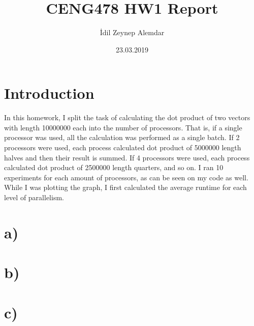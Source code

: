 \documentclass[12pt]{article}
\title{CENG478 HW1 Report}
\author{İdil Zeynep Alemdar}
\date{23.03.2019}
\begin{document}
	\begin{titlepage}
		\maketitle
	\end{titlepage}
\section*{Introduction}
In this homework, I split the task of calculating the dot product of two vectors with length 10000000 each into the number of processors. That is, if a single processor was used, all the calculation was performed as a single batch. If 2 processors were used, each process calculated dot product of 5000000 length halves and then their result is summed. If 4 processors were used, each process calculated dot product of 2500000 length quarters, and so on. I ran 10 experiments for each amount of processors, as can be seen on my code as well. While I was plotting the graph, I first calculated the average runtime for each level of parallelism.
\section*{a)}
\section*{b)}
\section*{c)}
\end{document}
